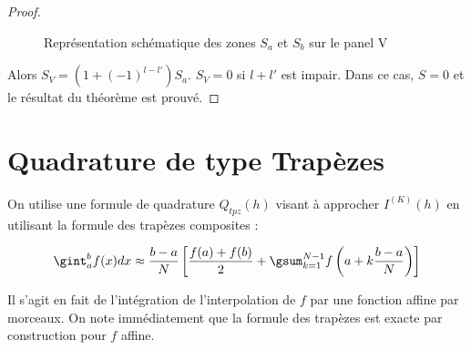 \begin{proof}
\begin{figure}
\begin{center}
\end{center}
\caption{Représentation schématique des zones $S_a$ et $S_b$ sur le panel V}
\label{fig: zones panel V}
\end{figure}

Alors $S_V=(1+(-1)^{l-l'})S_a$. $S_V=0$ si $l+l'$ est impair. Dans ce cas, $S=0$ et le résultat du théorème est prouvé.

 







\end{proof}


















\section{Quadrature de type Trapèzes}  %

On utilise une formule de quadrature $Q_{tpz}(h)$ visant à approcher $I^{(K)}(h)$ en utilisant la formule des trapèzes composites :

\begin{equation}
\gint_{a}^b f(x)dx \approx \dfrac{b-a}{N} \left[ \dfrac{f(a)+f(b)}{2} + \gsum_{k=1}^{N-1} f\left( a+k \dfrac{b-a}{N} \right) \right]
\label{eq:trapezes composites}
\end{equation}

Il s'agit en fait de l'intégration de l'interpolation de $f$ par une fonction affine par morceaux. On note immédiatement que la formule des trapèzes est exacte par construction pour $f$ affine.

